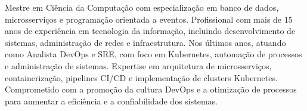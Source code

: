 

\begin{cvparagraph}

Mestre em Ciência da Computação com especialização em banco de dados, microsserviços e programação orientada a eventos. Profissional com mais de 15 anos de experiência em tecnologia da informação, incluindo desenvolvimento de sistemas, administração de redes e infraestrutura. Nos últimos anos, atuando como Analista DevOps e SRE, com foco em Kubernetes, automação de processos e administração de sistemas. Expertise em arquitetura de microsserviços, containerização, pipelines CI/CD e implementação de clusters Kubernetes. Comprometido com a promoção da cultura DevOps e a otimização de processos para aumentar a eficiência e a confiabilidade dos sistemas.
\end{cvparagraph}
